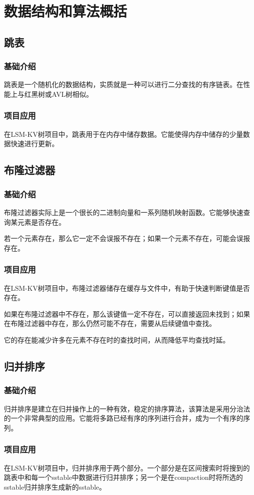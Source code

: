 \documentclass[UTF8]{ctexart}
\begin{document}
\section{数据结构和算法概括}
\subsection{跳表}
\subsubsection{基础介绍}
跳表是一个随机化的数据结构，实质就是一种可以进行二分查找的有序链表。在性能上与红黑树或AVL树相似。
\subsubsection{项目应用}
在LSM-KV树项目中，跳表用于在内存中储存数据。它能使得内存中储存的少量数据快速进行更新。
\subsection{布隆过滤器}
\subsubsection{基础介绍}
布隆过滤器实际上是一个很长的二进制向量和一系列随机映射函数。它能够快速查询某元素是否存在。

若一个元素存在，那么它一定不会误报不存在；如果一个元素不存在，可能会误报存在。
\subsubsection{项目应用}
在LSM-KV树项目中，布隆过滤器储存在缓存与文件中，有助于快速判断键值是否存在。

如果在布隆过滤器中不存在，那么该键值一定不存在，可以直接返回未找到；如果在布隆过滤器中存在，那么仍然可能不存在，需要从后续键值中查找。

它的存在能减少许多在元素不存在时的查找时间，从而降低平均查找时延。
\subsection{归并排序}
\subsubsection{基础介绍}
归并排序是建立在归并操作上的一种有效，稳定的排序算法，该算法是采用分治法的一个非常典型的应用。它能将多路已经有序的序列进行合并，成为一个有序的序列。
\subsubsection{项目应用}
在LSM-KV树项目中，归并排序用于两个部分。一个部分是在区间搜索时将搜到的跳表中和每一个sstable中数据进行归并排序；另一个是在compaction时将所选的sstable归并排序生成新的sstable。
\end{document}

